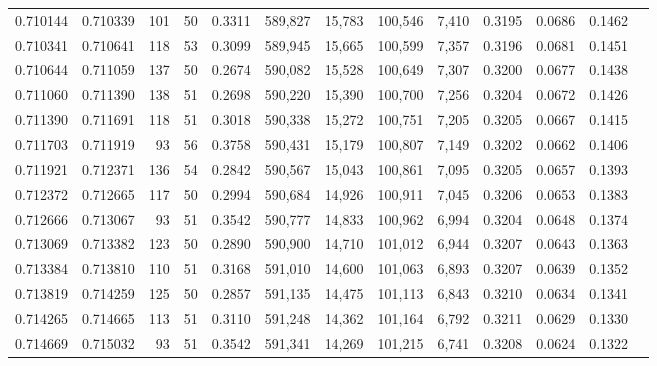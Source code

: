 \begin{tabular}{rrrrrrrrrrrrr}
0.710144 & 0.710339 &   101 &  50 &                                     0.3311 & 589,827 &  15,783 & 100,546 &   7,410 & 0.3195 & 0.0686 & 0.1462 \\
0.710341 & 0.710641 &   118 &  53 &                                     0.3099 & 589,945 &  15,665 & 100,599 &   7,357 & 0.3196 & 0.0681 & 0.1451 \\
0.710644 & 0.711059 &   137 &  50 &                                     0.2674 & 590,082 &  15,528 & 100,649 &   7,307 & 0.3200 & 0.0677 & 0.1438 \\
0.711060 & 0.711390 &   138 &  51 &                                     0.2698 & 590,220 &  15,390 & 100,700 &   7,256 & 0.3204 & 0.0672 & 0.1426 \\
0.711390 & 0.711691 &   118 &  51 &                                     0.3018 & 590,338 &  15,272 & 100,751 &   7,205 & 0.3205 & 0.0667 & 0.1415 \\
0.711703 & 0.711919 &    93 &  56 &                                     0.3758 & 590,431 &  15,179 & 100,807 &   7,149 & 0.3202 & 0.0662 & 0.1406 \\
0.711921 & 0.712371 &   136 &  54 &                                     0.2842 & 590,567 &  15,043 & 100,861 &   7,095 & 0.3205 & 0.0657 & 0.1393 \\
0.712372 & 0.712665 &   117 &  50 &                                     0.2994 & 590,684 &  14,926 & 100,911 &   7,045 & 0.3206 & 0.0653 & 0.1383 \\
0.712666 & 0.713067 &    93 &  51 &                                     0.3542 & 590,777 &  14,833 & 100,962 &   6,994 & 0.3204 & 0.0648 & 0.1374 \\
0.713069 & 0.713382 &   123 &  50 &                                     0.2890 & 590,900 &  14,710 & 101,012 &   6,944 & 0.3207 & 0.0643 & 0.1363 \\
0.713384 & 0.713810 &   110 &  51 &                                     0.3168 & 591,010 &  14,600 & 101,063 &   6,893 & 0.3207 & 0.0639 & 0.1352 \\
0.713819 & 0.714259 &   125 &  50 &                                     0.2857 & 591,135 &  14,475 & 101,113 &   6,843 & 0.3210 & 0.0634 & 0.1341 \\
0.714265 & 0.714665 &   113 &  51 &                                     0.3110 & 591,248 &  14,362 & 101,164 &   6,792 & 0.3211 & 0.0629 & 0.1330 \\
0.714669 & 0.715032 &    93 &  51 &                                     0.3542 & 591,341 &  14,269 & 101,215 &   6,741 & 0.3208 & 0.0624 & 0.1322 \\

\end{tabular}
